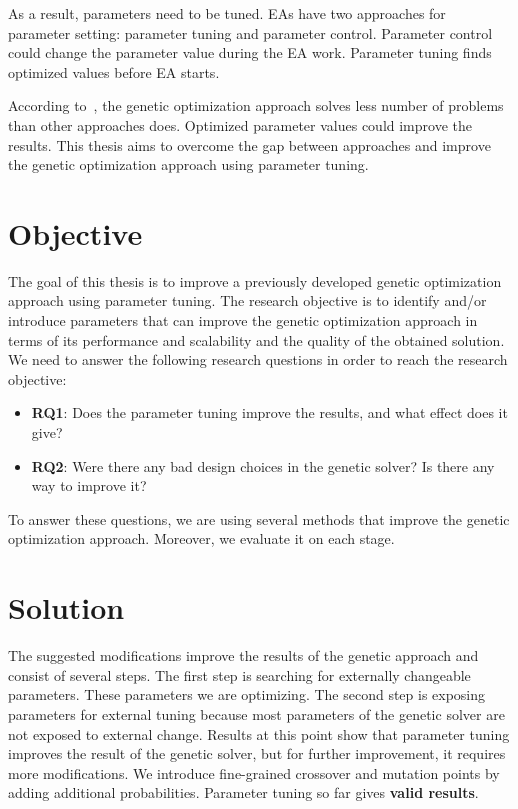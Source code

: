 As a result, parameters need to be tuned. EAs have two approaches for parameter setting: parameter tuning and parameter control. Parameter control could change the parameter value during the EA work. Parameter tuning finds optimized values before EA starts.

According to~\cite{ahmad18}, the genetic optimization approach solves less number of problems than other approaches does. Optimized parameter values could improve the results. This thesis aims to overcome the gap between approaches and improve the genetic optimization approach using parameter tuning.


\section{Objective}
The goal of this thesis is to improve a previously developed genetic optimization approach using parameter tuning.
The research objective is to identify and/or introduce parameters that can improve the genetic optimization approach in terms of its performance and scalability and the quality of the obtained solution. We need to answer the following research questions in order to reach the research objective: 
\begin{itemize}
	\item \textbf{RQ1}: Does the parameter tuning improve the results, and what effect does it give?
	\item \textbf{RQ2}: Were there any bad design choices in the genetic solver? Is there any way to improve it?
\end{itemize}

To answer these questions, we are using several methods that improve the genetic optimization approach. Moreover, we evaluate it on each stage. 

\section{Solution}

The suggested modifications improve the results of the genetic approach and consist of several steps.
The first step is searching for externally changeable parameters. These parameters we are optimizing. 
The second step is exposing parameters for external tuning because most parameters of the genetic solver are not exposed to external change.
Results at this point show that parameter tuning improves the result of the genetic solver, but for further improvement, it requires more modifications.
We introduce fine-grained crossover and mutation points by adding additional probabilities. Parameter tuning so far gives \textbf{valid results}. 

